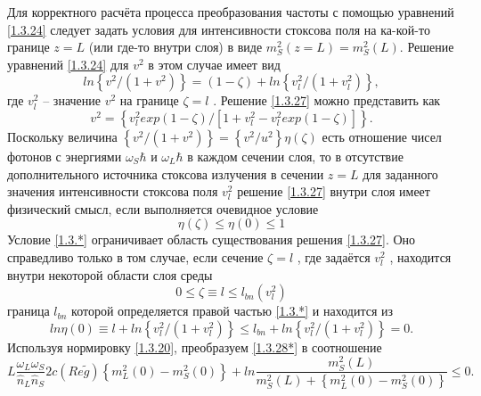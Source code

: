 \documentclass[a4paper]{article}
\begin{document}
Для корректного расчёта процесса преобразования частоты с помощью уравнений \eqref{1.3.24} следует задать условия для интенсивности стоксова поля на ка-кой-то границе $z=L$ (или где-то внутри слоя) в виде $m_{S}^{2}(z=L)=m_{S}^{2}(L)$. Решение уравнений \eqref{1.3.24} для $v^{2}$  в этом случае имеет вид 
\begin{equation}
	ln\left\{v^{2}/\left(1+v^{2}\right)\right\}=(1-\zeta)+ln\left\{v^{2}_{l}/\left(1+v_{l}^{2}\right)\right\},
	\label{1.3.27}
\end{equation}
где $v_{l}^{2}$ -- значение $v^{2}$  на границе $\zeta=l$ . Решение \eqref{1.3.27} можно представить как 
\begin{equation}
	v^{2}=\left\{v_{l}^{2}exp(1-\zeta)/\left[1+v_{l}^{2}-v_{l}^{2}exp(1-\zeta)\right]\right\}.
	\tag{27'}
	\label{1.3.27'}
\end{equation}
Поскольку величина $\left\{v^{2}/(1+v^{2})\right\}=\left\{v^{2}/u^{2}\right\}\eta(\zeta)$ есть отношение чисел фотонов с энергиями $ \omega_{S}\hbar $  и $ \omega_{L}\hbar $   в каждом сечении слоя, то в отсутствие дополнительного источника стоксова излучения в сечении $z=L$ для заданного значения интенсивности стоксова поля $v_{l}^{2}$ решение \eqref{1.3.27} внутри слоя имеет физический смысл, если выполняется очевидное условие 
\begin{equation}
	\eta(\zeta)\leq\eta(0)\leq1
	\tag{*}\label{1.3.*}
\end{equation}
Условие \eqref{1.3.*} ограничивает область существования решения \eqref{1.3.27}. Оно справедливо только в том случае, если сечение $\zeta=l$ , где задаётся $v_{l}^{2}$ , находится внутри некоторой области слоя среды 
\begin{equation}
	0\leq\zeta\equiv l\leq l_{bn}(v_{l}^{2})
	\label{1.3.28}
\end{equation}
граница $l_{bn}$  которой определяется правой частью \eqref{1.3.*} и находится из 
\begin{equation}
	ln\eta(0)\equiv l+ln\left\{v_{l}^{2}/(1+v_{l}^{2})\right\}\leq l_{bn}+ln\left\{v_{l}^{2}/(1+v_{l}^{2})\right\}=0.	
	\tag{28*}
	\label{1.3.28*}
\end{equation}
Используя нормировку \eqref{1.3.20}, преобразуем \eqref{1.3.28*} в соотношение  
\begin{equation}
	L\frac{\omega_{L}\omega_{S}}{\hat{n}_{L}\hat{n}_{S}}2c(Re\tilde{g})\left\{m_{L}^{2}(0)-m_{S}^{2}(0)\right\}+ln\frac{m_{S}^{2}(L)}{m_{S}^{2}(L)+\left\{m_{L}^{2}(0)-m_{S}^{2}(0)\right\}}\leq 0.
	\tag{28**}\label{1.3.28**}
\end{equation}
\end{document}
